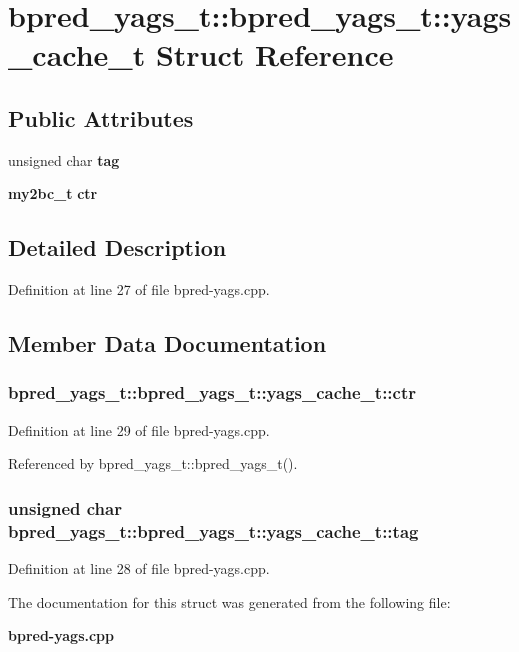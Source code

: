 \section{bpred\_\-yags\_\-t::bpred\_\-yags\_\-t::yags\_\-cache\_\-t Struct Reference}
\label{structbpred__yags__t_1_1yags__cache__t}
\subsection*{Public Attributes}
\begin{CompactItemize}
\item 
unsigned char {\bf tag}
\item 
{\bf my2bc\_\-t} {\bf ctr}
\end{CompactItemize}


\subsection{Detailed Description}


Definition at line 27 of file bpred-yags.cpp.

\subsection{Member Data Documentation}
\subsubsection[{ctr}]{ bpred\_\-yags\_\-t::bpred\_\-yags\_\-t::yags\_\-cache\_\-t::ctr}\label{structbpred__yags__t_1_1yags__cache__t_766eef85010eba429c002b21e53ddc07}




Definition at line 29 of file bpred-yags.cpp.

Referenced by bpred\_\-yags\_\-t::bpred\_\-yags\_\-t().
\subsubsection[{tag}]{\setlength{\rightskip}{0pt plus 5cm}unsigned char bpred\_\-yags\_\-t::bpred\_\-yags\_\-t::yags\_\-cache\_\-t::tag}\label{structbpred__yags__t_1_1yags__cache__t_85764fe706ad8932925a9331d6d48527}




Definition at line 28 of file bpred-yags.cpp.

The documentation for this struct was generated from the following file:\begin{CompactItemize}
\item 
{\bf bpred-yags.cpp}\end{CompactItemize}
